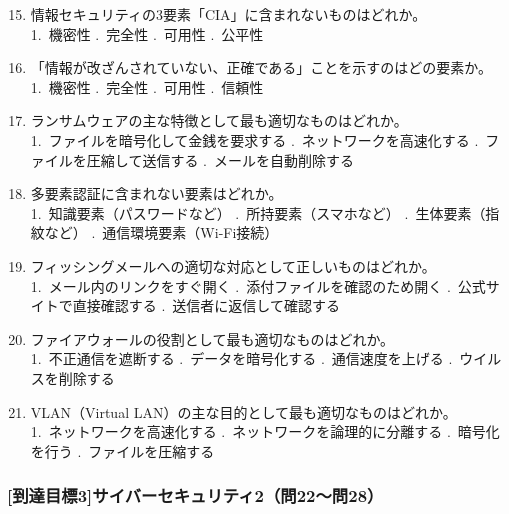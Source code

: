 \documentclass[b4paper,7pt,twocolumn,landscape]{jsarticle}
\begin{document}
\begin{enumerate}
\setcounter{enumi}{14}
\item 情報セキュリティの3要素「CIA」に含まれないものはどれか。\\
1.~機密性 .~完全性 .~可用性 .~公平性

\item 「情報が改ざんされていない、正確である」ことを示すのはどの要素か。\\
1.~機密性 .~完全性 .~可用性 .~信頼性

\item ランサムウェアの主な特徴として最も適切なものはどれか。\\
1.~ファイルを暗号化して金銭を要求する .~ネットワークを高速化する .~ファイルを圧縮して送信する .~メールを自動削除する

\item 多要素認証に含まれない要素はどれか。\\
1.~知識要素（パスワードなど） .~所持要素（スマホなど） .~生体要素（指紋など） .~通信環境要素（Wi-Fi接続）

\item フィッシングメールへの適切な対応として正しいものはどれか。\\
1.~メール内のリンクをすぐ開く .~添付ファイルを確認のため開く .~公式サイトで直接確認する .~送信者に返信して確認する

\item ファイアウォールの役割として最も適切なものはどれか。\\
1.~不正通信を遮断する .~データを暗号化する .~通信速度を上げる .~ウイルスを削除する

\item VLAN（Virtual LAN）の主な目的として最も適切なものはどれか。\\
1.~ネットワークを高速化する .~ネットワークを論理的に分離する .~暗号化を行う .~ファイルを圧縮する
\end{enumerate}



\subsubsection*{[到達目標3]サイバーセキュリティ2（問22〜問28）}
\end{document}
